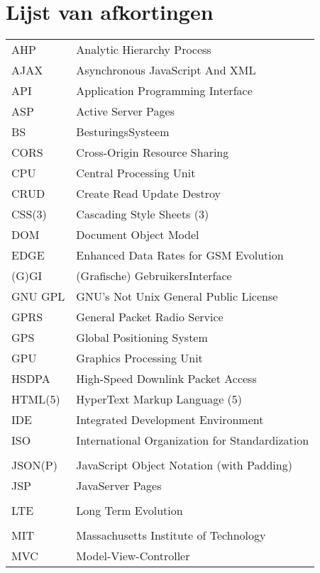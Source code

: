 \documentclass[master=cws,dutch,masteroption={vs,gs},inputenc=utf8]{kulemt}
\begin{document}
\chapter{Lijst van afkortingen}
\begin{flushleft}
  \renewcommand{\arraystretch}{1.1}
  \begin{longtable}{p{2cm} l}
     AHP & Analytic Hierarchy Process \\
     AJAX & Asynchronous JavaScript And XML \\
     API & Application Programming Interface \\
     ASP & Active Server Pages \\
     BS & BesturingsSysteem \\
     CORS & Cross-Origin Resource Sharing \\
     CPU & Central Processing Unit \\
     CRUD & Create Read Update Destroy \\
     CSS(3) & Cascading Style Sheets (3) \\
     DOM & Document Object Model \\
     EDGE & Enhanced Data Rates for GSM Evolution \\
     (G)GI & (Grafische) GebruikersInterface \\
     GNU GPL & GNU's Not Unix General Public License \\
     GPRS & General Packet Radio Service \\
     GPS & Global Positioning System \\
     GPU & Graphics Processing Unit \\
     HSDPA & High-Speed Downlink Packet Access \\
     HTML(5) & HyperText Markup Language (5) \\
     IDE & Integrated Development Environment \\
     ISO & International Organization for Standardization \\
     \jqma{} & \jqm{} \\
     JSON(P)  & JavaScript Object Notation (with Padding) \\
     JSP & JavaServer Pages \\
     \kendoa{} & \kendo{} \\
     LTE & Long Term Evolution \\
     \lungoa{} & \lungo{} \\
     MIT & Massachusetts Institute of Technology \\
     MVC & Model-View-Controller \\

\end{longtable}
\end{flushleft}
\end{document}
